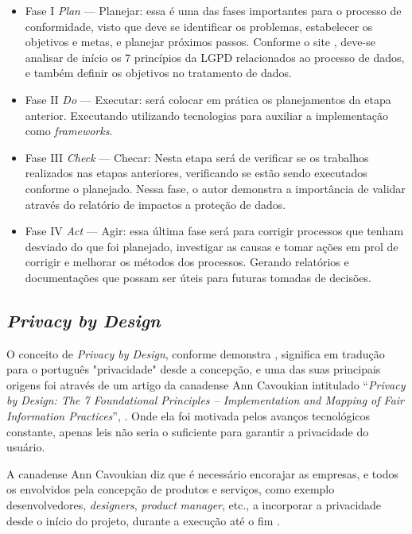 \documentclass[
	12pt,				%
	openright,			%
	oneside,			%
	a4paper,			%
	english,			%
	french,				%
	spanish,			%
	brazil,				%
	]{abntex2}
\begin{document}
\begin{itemize}
\item Fase I  \textit{Plan} — Planejar: essa é uma das fases importantes para o processo de conformidade, visto que deve se identificar os problemas, estabelecer os objetivos e metas, e planejar próximos passos. Conforme o site , deve-se analisar de início os 7 princípios da LGPD relacionados ao processo de dados, e também definir os objetivos no tratamento de dados.
\item Fase II \textit{Do} — Executar: será colocar em prática os planejamentos da etapa anterior. Executando utilizando tecnologias para auxiliar a implementação como \textit{frameworks}.
\item Fase III \textit{Check} — Checar: Nesta etapa será de verificar se os trabalhos realizados nas etapas anteriores, verificando se estão sendo executados conforme o planejado. Nessa fase, o autor demonstra a importância de validar através do relatório de impactos a proteção de dados.
\item Fase IV \textit{Act} — Agir:  essa última fase será para corrigir processos que tenham desviado do que foi planejado, investigar as causas e tomar ações em prol de corrigir e melhorar os métodos dos processos. Gerando relatórios e documentações que possam ser úteis para futuras tomadas de decisões.
\end{itemize}

\subsection{ \textit{Privacy by Design}  }

O conceito de \textit{Privacy by Design}, conforme demonstra \cite{oliveira2020}, significa em tradução para o português "privacidade" desde a concepção, e uma das suas principais origens foi através de um artigo da canadense Ann Cavoukian intitulado “\textit{Privacy by Design: The 7 Foundational Principles – Implementation and Mapping of Fair Information Practices}”, \cite{Jimene2020}. Onde ela foi motivada pelos avanços tecnológicos constante, apenas leis não seria o suficiente para garantir a privacidade do usuário. 

A canadense Ann Cavoukian diz que é necessário encorajar as empresas, e todos os envolvidos pela concepção de produtos e serviços, como exemplo desenvolvedores, \textit{designers}, \textit{product} \textit{manager}, etc., a incorporar a privacidade desde o início do projeto, durante a execução até o fim \cite{Vainzof2020}. 
\end{document}
